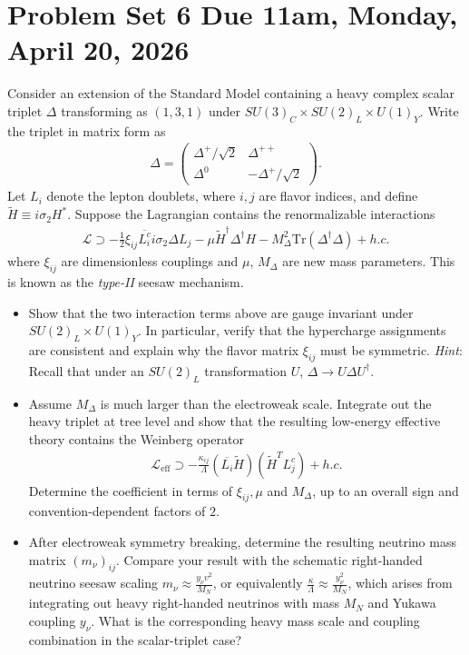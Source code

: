 \section*{Problem Set 6 Due 11am, Monday, April 20, 2026}

Consider an extension of the Standard Model containing a heavy complex scalar
triplet $\Delta$ transforming as $(1,3,1)$ under $SU(3)_C\times SU(2)_L\times U(1)_Y$. Write the triplet in matrix form as
\begin{align}
    \Delta=
    \begin{pmatrix}
    \Delta^+/\sqrt{2}& \Delta^{++}\\
    \Delta^0         & -\Delta^{+}/\sqrt{2}    
    \end{pmatrix}.
\end{align}
Let $L_i$ denote the lepton doublets, where $i,j$ are flavor indices, and define $\tilde{H}\equiv i\sigma_2 H^*$. Suppose the Lagrangian contains the renormalizable interactions
\begin{align}
    \mathcal{L}\supset-\frac{1}{2}\xi_{ij} \overline{L_i^c} i\sigma_2 \Delta L_j-\mu \tilde{H}^\dagger\Delta^\dagger H - M_\Delta^2 \text{Tr}(\Delta^\dagger \Delta)+h.c.
\end{align}
where $\xi_{ij}$ are dimensionless couplings and $\mu$, $M_\Delta$ are new mass parameters. This is known as the \textit{type-II} seesaw mechanism.
\begin{itemize}
    \item [(a)] Show that the two interaction terms above are gauge invariant under $SU(2)_L\times U(1)_Y$. In particular, verify that the hypercharge assignments are consistent and explain why the flavor matrix $\xi_{ij}$ must be symmetric. \textit{Hint}: Recall that under an $SU(2)_L$ transformation $U$, $\Delta\to U\Delta U^\dagger$.
    \item [(b)] Assume $M_\Delta$ is much larger than the electroweak scale. Integrate out the heavy triplet at tree level and show that the resulting low-energy effective theory contains the Weinberg operator 
    \begin{align}
        \mathcal{L}_\text{eff}\supset - \frac{\kappa_{ij}}{\Lambda} (\overline{L_i}\tilde{H})(\tilde{H}^T L_j^c) +h.c.
    \end{align}
    Determine the coefficient in terms of $\xi_{ij}, \mu$ and $M_\Delta$, up to an overall sign and convention-dependent factors of $2$.
    \item [(c)] After electroweak symmetry breaking, determine the resulting neutrino mass matrix $(m_\nu)_{ij}$. Compare your result with the schematic right-handed neutrino seesaw scaling $m_\nu\approx\frac{y_\nu v^2}{M_N}$, or equivalently $\frac{\kappa}{\Lambda}\approx \frac{y_\nu^2}{M_N}$, which arises from integrating out heavy right-handed neutrinos with mass $M_N$ and Yukawa coupling $y_\nu$. What is the corresponding heavy mass scale and coupling combination in the scalar-triplet case?
\end{itemize}



